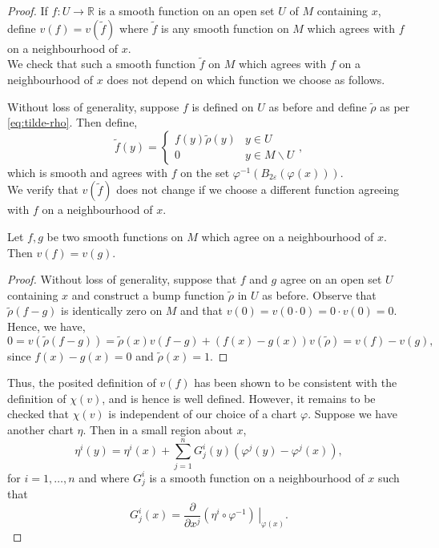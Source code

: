 \documentclass[12pt,a4paper]{article}
\begin{document}
\begin{proof}
If $f:U\to\mathbb{R}$ is a smooth function on an open set $U$ of $M$ containing $x$, define $v(f)=v(\tilde{f})$ where $\tilde{f}$ is any smooth function on $M$ which agrees with $f$ on a neighbourhood of $x$.\\

We check that such a smooth function $\tilde{f}$ on $M$ which agrees with $f$ on a neighbourhood of $x$ does not depend on which function we choose as follows.

Without loss of generality, suppose $f$ is defined on $U$ as before and define $\tilde{\rho}$ as per \eqref{eq:tilde-rho}. Then define,
\begin{equation}
\tilde{f}(y)=\begin{cases}
f(y)\tilde{\rho}(y) & y\in U\\
0 & y\in M\backslash U
\end{cases},
\end{equation}
which is smooth and agrees with $f$ on the set $\varphi^{-1}\left( B_{2\varepsilon}(\varphi(x)) \right)$.\\

We verify that $v(\tilde{f})$ does not change if we choose a different function agreeing with $f$ on a neighbourhood of $x$.
\begin{lemma}
Let $f,g$ be two smooth functions on $M$ which agree on a neighbourhood of $x$. Then $v(f)=v(g)$.
\end{lemma}
\begin{proof}
Without loss of generality, suppose that $f$ and $g$ agree on an open set $U$ containing $x$ and construct a bump function $\tilde{\rho}$ in $U$ as before. Observe that $\tilde{\rho}(f-g)$ is identically zero on $M$ and that $v(0)=v(0\cdot 0)=0\cdot v(0)=0$. Hence, we have,
\[
0=v(\tilde{\rho}(f-g))=\tilde{\rho}(x)v(f-g)+(f(x)-g(x))v(\tilde{\rho})=v(f)-v(g),
\]
since $f(x)-g(x)=0$ and $\tilde{\rho}(x)=1$.
\end{proof}
Thus, the posited definition of $v(f)$ has been shown to be consistent with the definition of $\chi(v)$, and is hence is well defined. However, it remains to be checked that $\chi(v)$ is independent of our choice of a chart $\varphi$. Suppose we have another chart $\eta$. Then in a small region about $x$,
\begin{equation}
\eta^i(y)=\eta^i(x)+\sum_{j=1}^nG^i_j(y)\left( \varphi^j(y)-\varphi^j(x) \right),
\end{equation} 
for $i=1,\ldots,n$ and where $G^i_j$ is a smooth function on a neighbourhood of $x$ such that
\[
G^i_j(x)=\frac{\partial}{\partial x^j}\left.\left(\eta^i\circ\varphi^{-1}\right)\,\right\rvert_{\varphi(x)}.
\]


\end{proof}
\end{document}
